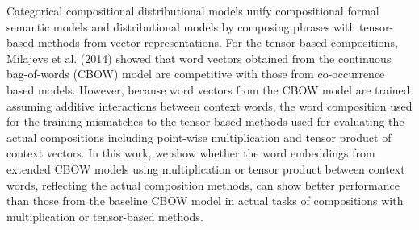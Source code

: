 Categorical compositional distributional models unify compositional formal semantic models and distributional models by composing phrases with tensor-based methods from vector representations. For the tensor-based compositions, Milajevs et al. (2014) showed that word vectors obtained from the continuous bag-of-words (CBOW) model are competitive with those from co-occurrence based models. However, because word vectors from the CBOW model are trained assuming additive interactions between context words, the word composition used for the training mismatches to the tensor-based methods used for evaluating the actual compositions including point-wise multiplication and tensor product of context vectors. In this work, we show whether the word embeddings from extended CBOW models using multiplication or tensor product between context words, reflecting the actual composition methods, can show better performance than those from the baseline CBOW model in actual tasks of compositions with multiplication or tensor-based methods.

